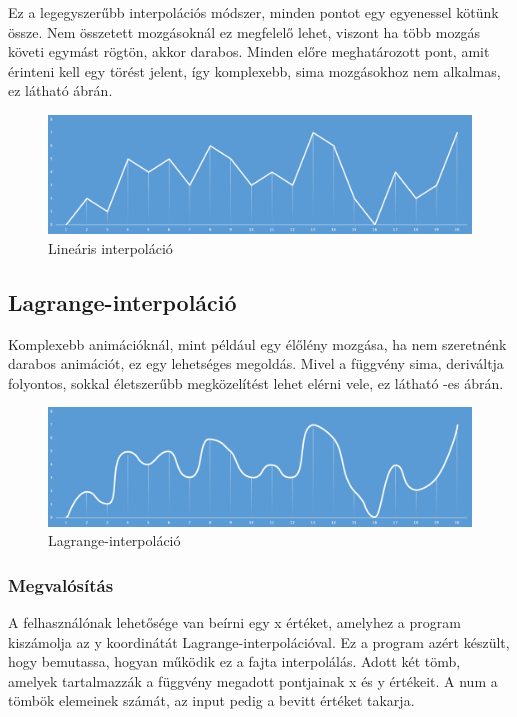 Ez a legegyszerűbb interpolációs módszer, minden pontot egy egyenessel kötünk össze. Nem összetett mozgásoknál ez megfelelő lehet, viszont ha több mozgás követi egymást rögtön, akkor darabos. Minden előre meghatározott pont, amit érinteni kell egy törést jelent, így komplexebb, sima mozgásokhoz nem alkalmas, ez látható  ábrán.

\begin{figure}[h]
\centering
\includegraphics[scale=0.43]{kepek/linear_interpol.png}
\caption{Lineáris interpoláció}
\label{fig:linear}
\end{figure}

\subsection{Lagrange-interpoláció}

Komplexebb animációknál, mint például egy élőlény mozgása, ha nem szeretnénk darabos animációt, ez egy lehetséges megoldás. Mivel a függvény sima, deriváltja folyontos, sokkal életszerűbb megközelítést lehet elérni vele, ez látható -es ábrán. 

\begin{figure}[h]
\centering
\includegraphics[scale=0.43]{kepek/non_linear_interpol.png}
\caption{Lagrange-interpoláció}
\label{fig:lagrange}
\end{figure}

\subsubsection{Megvalósítás}

A felhasználónak lehetősége van beírni egy x értéket, amelyhez a program kiszámolja az y koordinátát Lagrange-interpolációval. Ez a program azért készült, hogy bemutassa, hogyan működik ez a fajta interpolálás.
Adott két tömb, amelyek tartalmazzák a függvény megadott pontjainak x és y értékeit. A num a tömbök elemeinek számát, az input pedig a bevitt értéket takarja.

